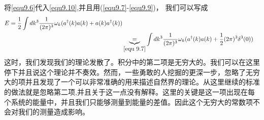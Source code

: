 将\ref{equ9.6}代入\ref{equ9.10},并且用(\ref{equ9.7}-\ref{equ9.9})， 我们可以写成
\begin{align} \label{equ9.11}
E=\frac{1}{2}\int dk^{3}\frac{1}{(2\pi)^{3}} \omega_{k}(a^{\dag}(k)a(k)+a(k)a^{\dag}(k))\\ &\underbrace{=}_{\ref{equ 9.7}}\int dk^{3}\frac{1}{(2\pi)^{3}} \omega_{k}(a^{\dag}(k)a(k)+\frac{1}{2}(2\pi)^{3}\delta^{3}(0))
\end{align}
这时，我们发现我们的理论发散了。积分中的第二项是无穷大的。我们可以在这里停下并且说这个理论并不奏效。然而，一些勇敢的人挖掘的更深一步，忽略了无穷大的项并且发现了一个可以非常准确的用来描述自然界的理论。从这里继续的标准的做法就是忽略第二项,并且关于这一点没有解释。这里的关键是这一项出现在每个系统的能量中，并且我们只能够测量到能量的差值。因此这个无穷大的常数项不会对我们的测量造成影响。

